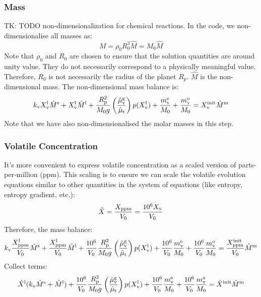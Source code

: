 \subsubsection{Mass}
TK: TODO non-dimensionalization for chemical reactions. 
In the code, we non-dimensionalise all masses as:
\begin{equation}
M = \rho_0 R_0^3 \hat{M} = M_0 \hat{M}
\end{equation}
Note that $\rho_0$ and $R_0$ are chosen to ensure that the solution quantities are around unity value.  They do not necessarily correspond to a physically meaningful value.  Therefore, $R_0$ is not necessarily the radius of the planet $R_p$.  $\hat{M}$ is the non-dimensional mass.  The non-dimensional mass balance is:
\begin{equation}
k_{\rm v} X_{\rm v}^{\rm l} \hat{M}^{\rm s} + X_{\rm v}^{\rm l} \hat{M}^{\rm l} + \frac{R_{\rm p}^2}{M_0 g} \left( \frac{\hat{\mu}_{\rm v}^{\rm g}}{\hat{\mu}_{\rm t}} \right) p (X_{\rm v}^{\rm l}) + \frac{m_{\rm v}^{\rm e}}{M_0} + \frac{m_{\rm v}^{\rm o}}{M_0} = X_{\rm v}^{\rm init} \hat{M}^{\rm m}
\end{equation}
Note that we have also non-dimensionalised the molar masses in this step.
\subsubsection{Volatile Concentration}
It's more convenient to express volatile concentration as a scaled version of parts-per-million (ppm).  This scaling is to ensure we can scale the volatile evolution equations similar to other quantities in the system of equations (like entropy, entropy gradient, etc.):
\begin{equation}
\hat{X} = \frac{X_{\rm ppm}}{V_0} = \frac{10^6 X_{\rm v}}{V_0}
\end{equation}
Therefore, the mass balance:
\begin{equation}
k_{\rm v} \frac{X_{\rm ppm}^{\rm l}}{V_0} \hat{M}^{\rm s} + \frac{X_{\rm ppm}^{\rm l}}{V_0} \hat{M}^{\rm l} + \frac{10^6}{V_0} \frac{R_{\rm p}^2}{M_0 g} \left( \frac{\hat{\mu}_{\rm v}^{\rm g}}{\hat{\mu}_{\rm t}} \right) p (X_{\rm v}^{\rm l}) + \frac{10^6}{V_0} \frac{m_{\rm v}^{\rm e}}{M_0} + \frac{10^6}{V_0} \frac{m_{\rm v}^{\rm o}}{M_0} = \frac{X_{\rm ppm}^{\rm init}}{V_0} \hat{M}^{\rm m}
\end{equation}
Collect terms:
\begin{equation}
\hat{X}^{\rm l} (k_{\rm v} \hat{M}^{\rm s} + \hat{M}^{\rm l}) + \frac{10^6}{V_0}\frac{R_{\rm p}^2}{M_0 g} \left( \frac{\hat{\mu}_{\rm v}^{\rm g}}{\hat{\mu}_{\rm t}} \right) p (X_{\rm v}^{\rm l}) + \frac{10^6}{V_0} \frac{m_{\rm v}^{\rm e}}{M_0} + \frac{10^6}{V_0} \frac{m_{\rm v}^{\rm o}}{M_0} = \hat{X}^{\rm init} \hat{M}^{\rm m}
\end{equation}
